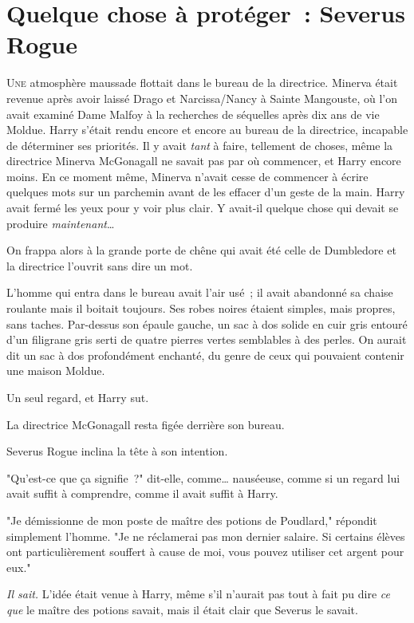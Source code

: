\chapter{Quelque chose à protéger~: Severus Rogue}

\lettrine{U}{ne} atmosphère maussade flottait dans le bureau de la directrice. Minerva était revenue après avoir laissé Drago et Narcissa/Nancy à Sainte Mangouste, où l'on avait examiné Dame Malfoy à la recherches de séquelles après dix ans de vie Moldue. Harry s'était rendu encore et encore au bureau de la directrice, incapable de déterminer ses priorités. Il y avait \emph{tant} à faire, tellement de choses, même la directrice Minerva McGonagall ne savait pas par où commencer, et Harry encore moins. En ce moment même, Minerva n'avait cesse de commencer à écrire quelques mots sur un parchemin avant de les effacer d'un geste de la main. Harry avait fermé les yeux pour y voir plus clair. Y avait-il quelque chose qui devait se produire \emph{maintenant}…

On frappa alors à la grande porte de chêne qui avait été celle de Dumbledore et la directrice l'ouvrit sans dire un mot.

L'homme qui entra dans le bureau avait l'air usé~; il avait abandonné sa chaise roulante mais il boitait toujours. Ses robes noires étaient simples, mais propres, sans taches. Par-dessus son épaule gauche, un sac à dos solide en cuir gris entouré d'un filigrane gris serti de quatre pierres vertes semblables à des perles. On aurait dit un sac à dos profondément enchanté, du genre de ceux qui pouvaient contenir une maison Moldue.

Un seul regard, et Harry sut.

La directrice McGonagall resta figée derrière son bureau.

Severus Rogue inclina la tête à son intention.

"Qu'est-ce que ça signifie~?" dit-elle, comme… nauséeuse, comme si un regard lui avait suffit à comprendre, comme il avait suffit à Harry.

"Je démissionne de mon poste de maître des potions de Poudlard," répondit simplement l'homme. "Je ne réclamerai pas mon dernier salaire. Si certains élèves ont particulièrement souffert à cause de moi, vous pouvez utiliser cet argent pour eux."

\emph{Il sait.} L'idée était venue à Harry, même s'il n'aurait pas tout à fait pu dire \emph{ce que} le maître des potions savait, mais il était clair que Severus le savait.

